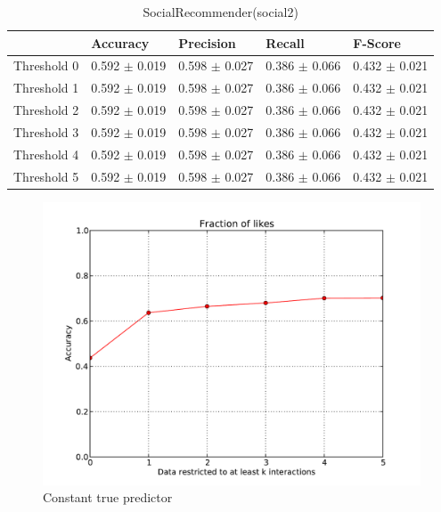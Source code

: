 \clearpage
\begin{table}[h]
	\centering
	\begin{tabular}{|l|l|l|l|l|} %
	\hline
	& Accuracy & Precision & Recall & F-Score \\ \hline
	Threshold 0 & 0.592	\( \pm \) 0.019	& 0.598	\( \pm \) 0.027	& 0.386	\( \pm \) 0.066	& 0.432	\( \pm \) 0.021	\\ \hline
	Threshold 1 & 0.592	\( \pm \) 0.019	& 0.598	\( \pm \) 0.027	& 0.386	\( \pm \) 0.066	& 0.432	\( \pm \) 0.021	\\ \hline
	Threshold 2 & 0.592	\( \pm \) 0.019	& 0.598	\( \pm \) 0.027	& 0.386	\( \pm \) 0.066	& 0.432	\( \pm \) 0.021	\\ \hline
	Threshold 3 & 0.592	\( \pm \) 0.019	& 0.598	\( \pm \) 0.027	& 0.386	\( \pm \) 0.066	& 0.432	\( \pm \) 0.021	\\ \hline
	Threshold 4 & 0.592	\( \pm \) 0.019	& 0.598	\( \pm \) 0.027	& 0.386	\( \pm \) 0.066	& 0.432	\( \pm \) 0.021	\\ \hline
	Threshold 5 & 0.592	\( \pm \) 0.019	& 0.598	\( \pm \) 0.027	& 0.386	\( \pm \) 0.066	& 0.432	\( \pm \) 0.021	\\ \hline
	\end{tabular}
	\caption{SocialRecommender(social2)}
	\label{tab:revpol}
\end{table}




\begin{figure}[h]
	\begin{center}
		\includegraphics[scale=0.85]{imgs/ConstantPredictor(true).pdf}
		\caption{Constant true predictor}
	\end{center}
\end{figure}
\clearpage

